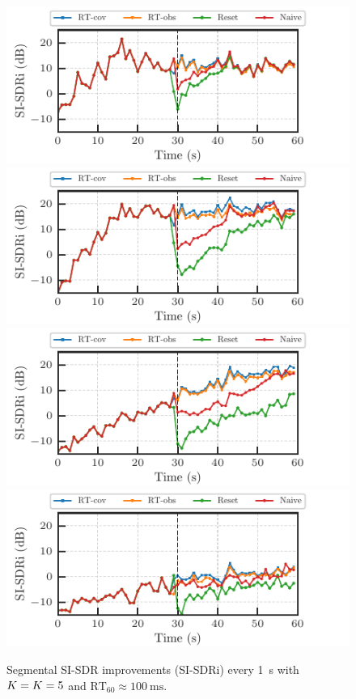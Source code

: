 \documentclass[sip,biber]{now-journal}
\begin{document}
\begin{figure}[t]
  \begin{minipage}[t]{\linewidth}
    \centering\includegraphics{figures/plots/online/Gauss_8000_fft4096_900.pdf}\label{fig:plot:gauss:900}
    \centering\includegraphics{figures/plots/online/Gauss_8000_fft4096_950.pdf}\label{fig:plot:gauss:950}
    \centering\includegraphics{figures/plots/online/Gauss_8000_fft4096_980.pdf}\label{fig:plot:gauss:980}
    \centering\includegraphics{figures/plots/online/Gauss_8000_fft4096_990.pdf}\label{fig:plot:gauss:990}
  \end{minipage}
  \caption{Segmental SI-SDR improvements (SI-SDRi) every \SI{1}{\second} with $K = K = 5$ and $\text{RT}_{60} \approx \SI{100}{\milli\second}$.}
\end{figure}
\end{document}
